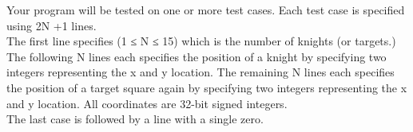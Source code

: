 Your program will be tested on one or more test cases. Each test case is specified using 2N +1 lines.
\\The first line specifies (1 ≤ N ≤ 15) which is the number of knights (or targets.) The following N lines each specifies the position of a knight by specifying two integers representing the x and y location. The remaining N lines each specifies the position of a target square again by specifying two integers representing the x and y location. All coordinates are 32-bit signed integers.
\\The last case is followed by a line with a single zero.